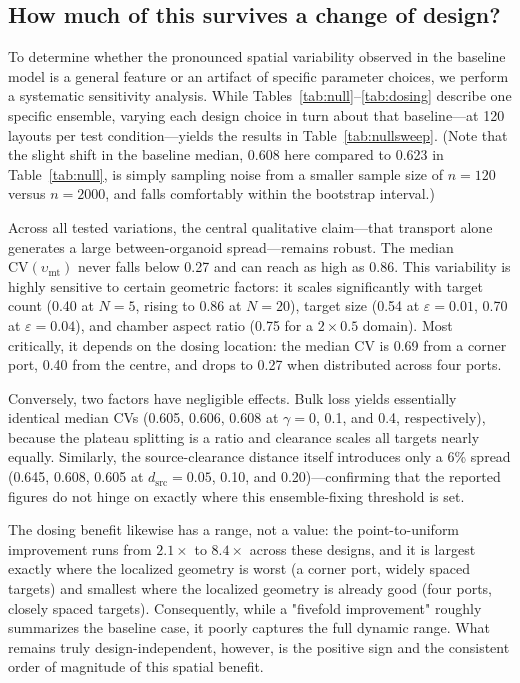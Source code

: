 \documentclass[pdflatex,sn-mathphys-num]{sn-jnl}
\numberwithin{equation}{section}
\theoremstyle{thmstyleone}%
\theoremstyle{definition}
\theoremstyle{remark}
\begin{document}
\subsection{How much of this survives a change of design?}
\label{subsec:nullrobust}
To determine whether the pronounced spatial variability observed in the baseline model is a general feature or an artifact of specific parameter choices, we perform a systematic sensitivity analysis. While Tables~\ref{tab:null}--\ref{tab:dosing} describe one specific ensemble, varying each design choice in turn about that baseline—at 120 layouts per test condition—yields the results in Table~\ref{tab:nullsweep}. (Note that the slight shift in the baseline median, 0.608 here compared to 0.623 in Table~\ref{tab:null}, is simply sampling noise from a smaller sample size of $n=120$ versus $n=2000$, and falls comfortably within the bootstrap interval.)

Across all tested variations, the central qualitative claim—that transport alone generates a large between-organoid spread—remains robust. The median $\mathrm{CV}(\upsilon_{\mathrm{mt}})$ never falls below 0.27 and can reach as high as 0.86. This variability is highly sensitive to certain geometric factors: it scales significantly with target count (0.40 at $N=5$, rising to 0.86 at $N=20$), target size (0.54 at $\varepsilon=0.01$, 0.70 at $\varepsilon=0.04$), and chamber aspect ratio (0.75 for a $2\times0.5$ domain). Most critically, it depends on the dosing location: the median CV is 0.69 from a corner port, 0.40 from the centre, and drops to 0.27 when distributed across four ports.

Conversely, two factors have negligible effects. Bulk loss yields essentially identical median CVs (0.605, 0.606, 0.608 at $\gamma=0$, 0.1, and 0.4, respectively), because the plateau splitting is a ratio and clearance scales all targets nearly equally. Similarly, the source-clearance distance itself introduces only a 6\% spread (0.645, 0.608, 0.605 at $d_{\mathrm{src}}=0.05$, 0.10, and 0.20)—confirming that the reported figures do not hinge on exactly where this ensemble-fixing threshold is set.

The dosing benefit likewise has a range, not a value:
the point-to-uniform improvement runs from $2.1\times$ to $8.4\times$
across these designs, and it is largest exactly where the localized geometry is
worst (a corner port, widely spaced targets) and smallest where the localized
geometry is already good (four ports, closely spaced targets). 
Consequently, while a "fivefold improvement" roughly summarizes the baseline case, it poorly captures the full dynamic range. What remains truly design-independent, however, is the positive sign and the consistent order of magnitude of this spatial benefit.
\end{document}
